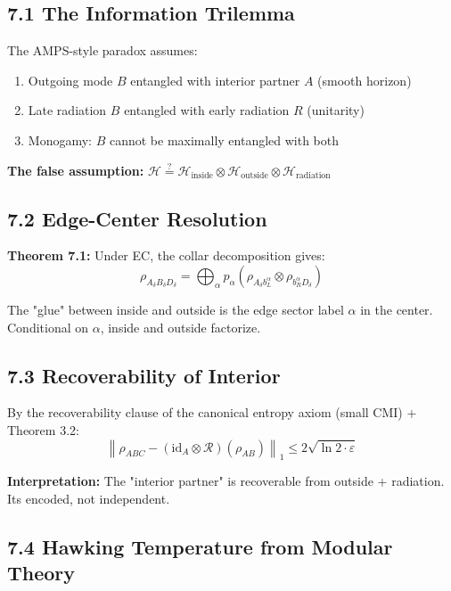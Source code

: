 \subsection{7.1 The Information Trilemma}\label{71-the-information-trilemma}

The AMPS-style paradox assumes:

\begin{enumerate}
\def\labelenumi{\arabic{enumi}.}
\tightlist
\item
  Outgoing mode \(B\) entangled with interior partner \(A\) (smooth horizon)
\item
  Late radiation \(B\) entangled with early radiation \(R\) (unitarity)
\item
  Monogamy: \(B\) cannot be maximally entangled with both
\end{enumerate}

\textbf{The false assumption:} \(\mathcal{H} \stackrel{?}{=} \mathcal{H}_{\text{inside}} \otimes \mathcal{H}_{\text{outside}} \otimes \mathcal{H}_{\text{radiation}}\)

\subsection{7.2 Edge-Center Resolution}\label{72-edge-center-resolution}

\textbf{Theorem 7.1:} Under EC, the collar decomposition gives: \[\rho_{A_\delta B_\delta D_\delta} = \bigoplus_\alpha p_\alpha \left(\rho_{A_\delta b_L^\alpha} \otimes \rho_{b_R^\alpha D_\delta}\right)\]

The "glue" between inside and outside is the edge sector label \(\alpha\) in the center. Conditional on \(\alpha\), inside and outside factorize.

\subsection{7.3 Recoverability of Interior}\label{73-recoverability-of-interior}

By the recoverability clause of the canonical entropy axiom (small CMI) + Theorem 3.2: \[\left\|\rho_{ABC} - (\text{id}_A \otimes \mathcal{R})(\rho_{AB})\right\|_1 \leq 2\sqrt{\ln 2 \cdot \varepsilon}\]

\textbf{Interpretation:} The "interior partner" is recoverable from outside + radiation. It\textquotesingle s encoded, not independent.

\subsection{7.4 Hawking Temperature from Modular Theory}\label{74-hawking-temperature-from-modular-theory}

